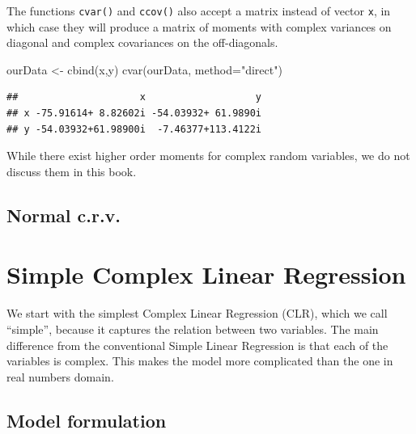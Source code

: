 \documentclass[
]{book}
\newenvironment{Shaded}{\begin{snugshade}}{\end{snugshade}}
\newcommand{\AttributeTok}[1]{\textcolor[rgb]{0.77,0.63,0.00}{#1}}
\newcommand{\FunctionTok}[1]{\textcolor[rgb]{0.00,0.00,0.00}{#1}}
\newcommand{\NormalTok}[1]{#1}
\newcommand{\OtherTok}[1]{\textcolor[rgb]{0.56,0.35,0.01}{#1}}
\newcommand{\StringTok}[1]{\textcolor[rgb]{0.31,0.60,0.02}{#1}}
\begin{document}
The functions \texttt{cvar()} and \texttt{ccov()} also accept a matrix instead of vector \texttt{x}, in which case they will produce a matrix of moments with complex variances on diagonal and complex covariances on the off-diagonals.

\begin{Shaded}
\begin{Highlighting}[]
\NormalTok{ourData }\OtherTok{\textless{}{-}} \FunctionTok{cbind}\NormalTok{(x,y)}
\FunctionTok{cvar}\NormalTok{(ourData, }\AttributeTok{method=}\StringTok{"direct"}\NormalTok{)}
\end{Highlighting}
\end{Shaded}

\begin{verbatim}
##                     x                   y
## x -75.91614+ 8.82602i -54.03932+ 61.9890i
## y -54.03932+61.98900i  -7.46377+113.4122i
\end{verbatim}

While there exist higher order moments for complex random variables, we do not discuss them in this book.

\hypertarget{normal-c.r.v.}{%
\section{Normal c.r.v.}\label{normal-c.r.v.}}

\hypertarget{simpleCLR}{%
\chapter{Simple Complex Linear Regression}\label{simpleCLR}}

We start with the simplest Complex Linear Regression (CLR), which we call ``simple'', because it captures the relation between two variables. The main difference from the conventional Simple Linear Regression is that each of the variables is complex. This makes the model more complicated than the one in real numbers domain.

\hypertarget{model-formulation}{%
\section{Model formulation}\label{model-formulation}}
\end{document}
